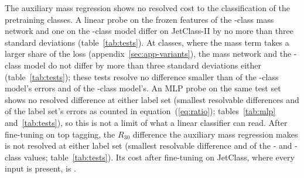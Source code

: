 The auxiliary mass regression shows no resolved cost to the classification of the pretraining classes. A linear
probe on the frozen features of the \Kres-class mass network and one on the \Kres-class %
model differ on JetClass-II by no more than three standard deviations (table~\ref{tab:tests}). At \Kcoarse{} classes, where the mass term takes a larger share of the %
loss (appendix~\ref{sec:app-variants}), the mass network and the \Kcoarse-class model do not
differ by more than three standard deviations either (table~\ref{tab:tests}); these tests resolve no difference
smaller than \MlstPwMassClsRes{} of the \Kres-class model's errors and \MlstPwMassClsCoarse{} of the \Kcoarse-class
model's. An MLP %
probe on the same test set shows no resolved difference at either label set (smallest resolvable differences
\MlstPwMlpMassRes{} and \MlstPwMlpMassCoarse{} of the label set's errors as counted in
equation~(\ref{eq:ratio}); tables~\ref{tab:mlp} and~\ref{tab:tests}), so this is not a limit of what a linear
classifier can read. %
After fine-tuning on top tagging, the $R_{30}$ difference the auxiliary mass regression makes is not resolved %
at either label set (smallest resolvable difference \MlstPwTopMassRes{} and \MlstPwTopMassCoarse{} of the
\Kres- and \Kcoarse-class values; table~\ref{tab:tests}). Its cost after fine-tuning on JetClass, where every input is
present, is .

